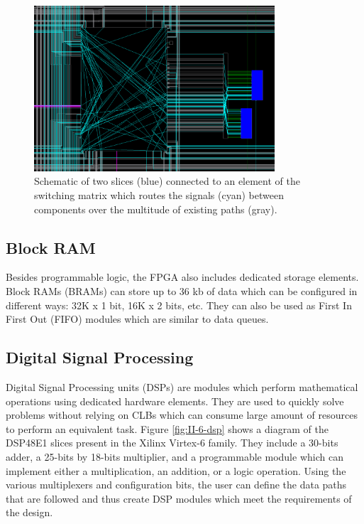       \begin{figure}[h!]
        \centering
        \includegraphics[width=0.8\textwidth]{img/II-6-irradiation/switch.png}
        \caption{Schematic of two slices (blue) connected to an element of the switching matrix which routes the signals (cyan) between components over the multitude of existing paths (gray).}
        \label{fig:II-6-switch}
      \end{figure}

    \subsection{Block RAM}

      Besides programmable logic, the FPGA also includes dedicated storage elements. Block RAMs (BRAMs) \cite{VIRTEX-RAM} can store up to 36 kb of data which can be configured in different ways: 32K x 1 bit, 16K x 2 bits, etc. They can also be used as First In First Out (FIFO) modules which are similar to data queues.

    \subsection{Digital Signal Processing}

      Digital Signal Processing units (DSPs) \cite{VIRTEX-DSP} are modules which perform mathematical operations using dedicated hardware elements. They are used to quickly solve problems without relying on CLBs which can consume large amount of resources to perform an equivalent task. Figure \ref{fig:II-6-dsp} shows a diagram of the DSP48E1 slices present in the Xilinx Virtex-6 family. They include a 30-bits adder, a 25-bits by 18-bits multiplier, and a programmable module which can implement either a multiplication, an addition, or a logic operation. Using the various multiplexers and configuration bits, the user can define the data paths that are followed and thus create DSP modules which meet the requirements of the design.

